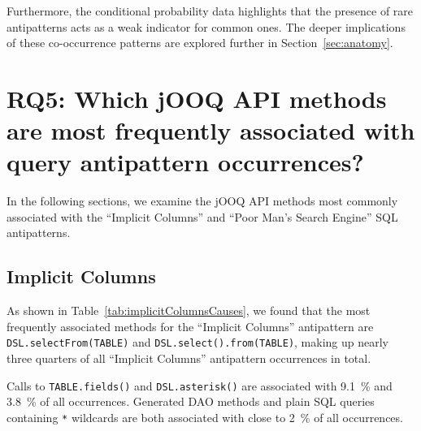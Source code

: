 Furthermore, the conditional probability data highlights that the presence of rare antipatterns acts as a weak indicator for common ones. The deeper implications of these co-occurrence patterns are explored further in Section~\ref{sec:anatomy}.

\section{RQ5: Which jOOQ API methods are most frequently associated with query antipattern occurrences?}\label{sec:resultsRQ5}

In the following sections, we examine the jOOQ API methods most commonly associated with the “Implicit Columns” and “Poor Man's Search Engine” SQL antipatterns.

\subsection{Implicit Columns}

As shown in Table~\ref{tab:implicitColumnsCauses}, we found that the most frequently associated methods for the “Implicit Columns” antipattern are \texttt{DSL.selectFrom(TABLE)} and \texttt{DSL.select().from(TABLE)}, making up nearly three quarters of all “Implicit Columns” antipattern occurrences in total.

Calls to \texttt{TABLE.fields()} and \texttt{DSL.asterisk()} are associated with \qty{9.1}{\percent} and \qty{3.8}{\percent} of all occurrences. Generated DAO methods and plain SQL queries containing \texttt{*} wildcards are both associated with close to \qty{2}{\percent} of all occurrences.

